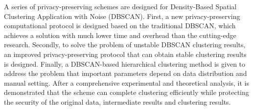 \begin{eabstract}
\begin{compactenum}
\item A series of privacy-preserving schemes are designed for Density-Based Spatial Clustering Application with Noise (DBSCAN). First, a new privacy-preserving computational protocol is designed based on the traditional DBSCAN, which achieves a solution with much lower time and overhead than the cutting-edge research. Secondly, to solve the problem of unstable DBSCAN clustering results, an improved privacy-preserving protocol that can obtain stable clustering results is designed. Finally, a DBSCAN-based hierarchical clustering method is given to address the problem that important parameters depend on data distribution and manual setting. After a comprehensive experimental and theoretical analysis, it is demonstrated that the scheme can complete clustering efficiently while protecting the security of the original data, intermediate results and clustering results. 
\end{compactenum}          
\end{eabstract}

